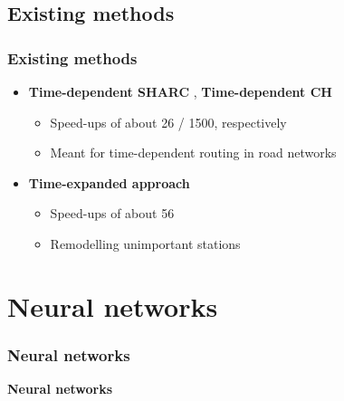 \documentclass[]{beamer}
\begin{document}
        \subsection{Existing methods}
        \begin{frame}
            \frametitle{Existing methods}
			\begin{itemize}
				\item \textbf{Time-dependent SHARC} \cite{sharc08}, \textbf{Time-dependent CH} \cite{timedepch09}
				\begin{itemize}
					\item Speed-ups of about 26 / 1500, respectively
					\item Meant for time-dependent routing in road networks
				\end{itemize}
				\item \textbf{Time-expanded approach} \cite{engtimeexp09}
				\begin{itemize}
					\item Speed-ups of about 56
					\item Remodelling unimportant stations
				\end{itemize}
			\end{itemize}
        \end{frame}
        
    \section{Neural networks}
    \begin{frame}
        \frametitle{Neural networks}
        \begin{center}
            \textcolor{red!80!black}{\textbf{Neural networks}}
        \end{center}
    \end{frame}
      
\end{document}
